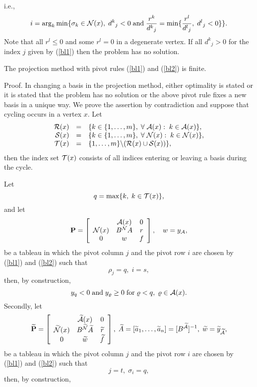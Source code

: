 i.e.,
\begin{equation} \label{bl2}
i =  \arg_k\min\{\sigma _k \in \N(x), \;
d^k{}_j < 0 \; \mbox{and} \; \frac{r^k}{d^k{}_j} = \min\{\frac{r^l}{d^l{}_j},
\; d^l{}_j < 0\}\}.
\end{equation}
Note that all $r^l \leq 0$ and some $r^l = 0$ in a degenerate vertex.  If all
$d^k{}_j > 0$ for the index $j$ given by (\ref{bl1}) then the problem has no
solution.
%
\begin{theorem} \label{s9}
The projection method with pivot rules (\ref{bl1}) and (\ref{bl2}) is finite.
\end{theorem}
%
Proof. In changing a basis in the projection method, either optimality is
stated or it is stated that the problem has no solution or the above
pivot rule fixes a new basis in a unique way. We prove the assertion by
contradiction and suppose that cycling occurs in a vertex $x$. Let
\[
\ba{.}{rcl}
\R(x) &=& \{k \in \{1, \ldots, m\}, \; \forall \; \A(x): \; k \in \A(x)\},\\
{\cal S}(x) &=& \{k \in \{1, \ldots, m\}, \; \forall \; \N(x): \; k \in
\N(x)\},\\
\T(x) &=& \{1, \ldots, m\} \backslash (\R(x) \cup {\cal S}(x))\},
\ea{.}
\]
then the index set
$\T(x)$ consists of all indices entering or leaving a basis during the cycle.
\par
Let
\[
q = \max\{k, \; k \in \T(x)\},
\]
and let
\[
{\bf P} = \ba{[}{ccc} &\A(x) & 0 \\\N(x) & B^{\N}A & r\\ 0 & w &
f\ea{]}, \quad w = y_{\A},
\]
be a tableau in which the pivot column $j$ and the pivot row $i$ are chosen by
(\ref{bl1}) and (\ref{bl2}) such that
%
\[
\rho _j = q, \; i = s,
\]
then, by construction,
\begin{equation} \label{vv}
y_q < 0 \; \mbox{and} \; y_{\rho} \geq 0 \; \mbox{for} \;  \rho < q, \; \rho
\in \A(x).
\end{equation}
Secondly, let
\[
\wi{{\bf P}}   = \ba{[}{ccc} & \wi{\A}(x) & 0  \\
\wi{\N}(x) & B^{\wi{\N}}\wi{A} & \wi{r}\\
0 & \wi{w} & \wi{f}\ea{]},
\; \wi{A} = [\wi{a}_1, \ldots, \wi{a}_n] = [B^{\wi{\A}}]^{-1},
\; \wi{w} = \wi{y}_{\wi{\A}},
\]
be a tableau in which the pivot column $j$ and the pivot row  $i$ are chosen by
(\ref{bl1}) and (\ref{bl2}) such that
%
\begin{equation} \label{uu}
j = t, \; \sigma _i = q,
\end{equation}
%
then, by construction,
